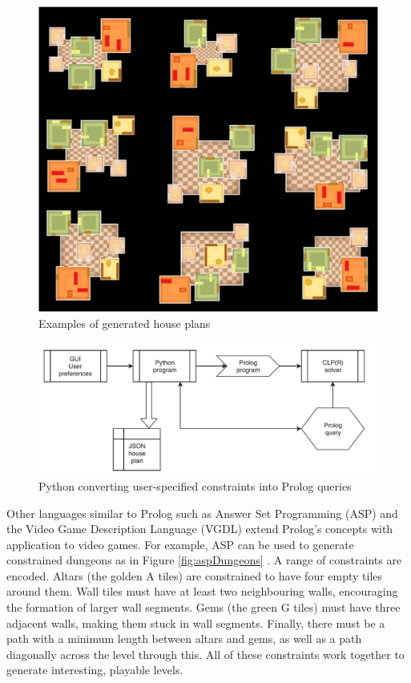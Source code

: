 \begin{figure}[H]
        \centering
        \includegraphics[width=\textwidth, height=0.3\textheight, keepaspectratio]{Images/HousePlans.jpg}
        \caption{Examples of generated house plans \cite{Prolog_Deep_Learning}}
        \label{fig:housePlans}
\end{figure}

\begin{figure}[H]
        \centering
        \includegraphics[width=\textwidth, height=0.3\textheight, keepaspectratio]{Images/PythonToProlog.png}
        \caption{Python converting user-specified constraints into Prolog queries \cite{Prolog_Deep_Learning}}
        \label{fig:pythonToProlog}
\end{figure}

Other languages similar to Prolog such as Answer Set Programming (ASP) and the Video Game Description Language (VGDL) extend Prolog's concepts with application to video games. For example, ASP can be used to generate constrained dungeons as in Figure \ref{fig:aspDungeons} \cite{pcgbook}. A range of constraints are encoded. Altars (the golden A tiles) are constrained to have four empty tiles around them. Wall tiles must have at least two neighbouring walls, encouraging the formation of larger wall segments. Gems (the green G tiles) must have three adjacent walls, making them stuck in wall segments. Finally, there must be a path with a minimum length between altars and gems, as well as a path diagonally across the level through this. All of these constraints work together to generate interesting, playable levels.

